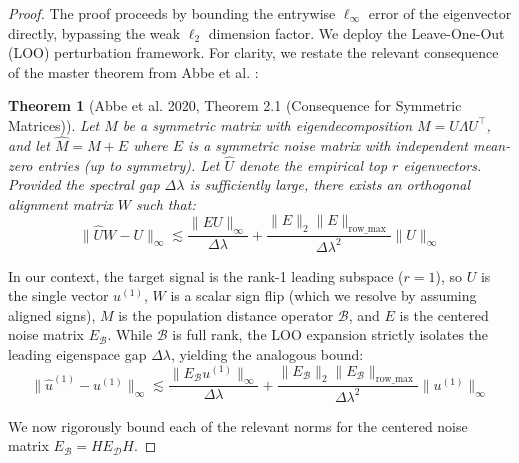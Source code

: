 \documentclass[11pt]{article}
\newtheorem{theorem}{Theorem}
\begin{document}
\begin{proof}
The proof proceeds by bounding the entrywise $\ell_\infty$ error of the eigenvector directly, bypassing the weak $\ell_2$ dimension factor. We deploy the Leave-One-Out (LOO) perturbation framework. For clarity, we restate the relevant consequence of the master theorem from Abbe et al. \cite{abbe2020entrywise}:

\begin{theorem}[Abbe et al. 2020, Theorem 2.1 (Consequence for Symmetric Matrices)]
Let $M$ be a symmetric matrix with eigendecomposition $M = U \Lambda U^\top$, and let $\hat{M} = M + E$ where $E$ is a symmetric noise matrix with independent mean-zero entries (up to symmetry). Let $\hat{U}$ denote the empirical top $r$ eigenvectors. Provided the spectral gap $\Delta\lambda$ is sufficiently large, there exists an orthogonal alignment matrix $W$ such that:
\begin{equation}
\|\hat{U} W - U\|_\infty \lesssim \frac{\|E U\|_\infty}{\Delta\lambda} + \frac{\|E\|_2 \|E\|_{\text{row\_max}}}{\Delta\lambda^2} \|U\|_\infty
\end{equation}
\end{theorem}

In our context, the target signal is the rank-1 leading subspace ($r=1$), so $U$ is the single vector $u^{(1)}$, $W$ is a scalar sign flip (which we resolve by assuming aligned signs), $M$ is the population distance operator $\mathcal{B}$, and $E$ is the centered noise matrix $E_{\mathcal{B}}$. While $\mathcal{B}$ is full rank, the LOO expansion strictly isolates the leading eigenspace gap $\Delta\lambda$, yielding the analogous bound:
\begin{equation}
\|\hat{u}^{(1)} - u^{(1)}\|_\infty \lesssim \frac{\|E_{\mathcal{B}} u^{(1)}\|_\infty}{\Delta\lambda} + \frac{\|E_{\mathcal{B}}\|_2 \|E_{\mathcal{B}}\|_{\text{row\_max}}}{\Delta\lambda^2} \|u^{(1)}\|_\infty
\end{equation}

We now rigorously bound each of the relevant norms for the centered noise matrix $E_{\mathcal{B}} = H E_{\mathcal{D}} H$.


\end{proof}
\end{document}
